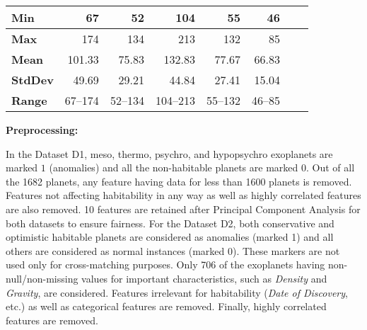 \documentclass[fleqn,usenatbib]{mnras}
\begin{document}
\begin{table*}
\begin{tabular}{|l|r|r|r|r|r|r|r|}
\textbf{Min}   & 67       & 52     & 104      & 55     & 46  \\ 
\hline
\textbf{Max}     & 174     & 134       & 213      & 132    & 85     \\ 
\hline
\textbf{Mean}       & 101.33      & 75.83       & 132.83   & 77.67      & 66.83   \\ 
\hline
\textbf{StdDev}    & 49.69     & 29.21    & 44.84     & 27.41   & 15.04  \\ 
\hline
\textbf{Range}    & 67--174    & 52--134     & 104--213    &55--132  & 46--85  \\ 
\hline
\end{tabular}
\end{table*}

\noindent \textbf{Preprocessing:}

In the Dataset D1, meso, thermo, psychro, and hypopsychro exoplanets are marked $1$ (anomalies) and all the non-habitable planets are marked $0$. Out of all the 1682 planets, any feature having data for less than 1600 planets is removed. Features not affecting habitability in any way as well as highly correlated features are also removed. 10 features are retained after Principal Component Analysis for both datasets to ensure fairness. For the Dataset D2, both conservative and optimistic habitable planets are considered as anomalies (marked 1) and all others are considered as normal instances (marked 0). These markers are not used only for cross-matching purposes. Only 706 of the exoplanets having non-null/non-missing values for important characteristics, such as \textsl{Density} and \textsl{Gravity}, are considered. Features irrelevant for habitability (\textsl{Date of Discovery}, etc.) as well as categorical features are removed. Finally, highly correlated features are removed.
\end{document}
